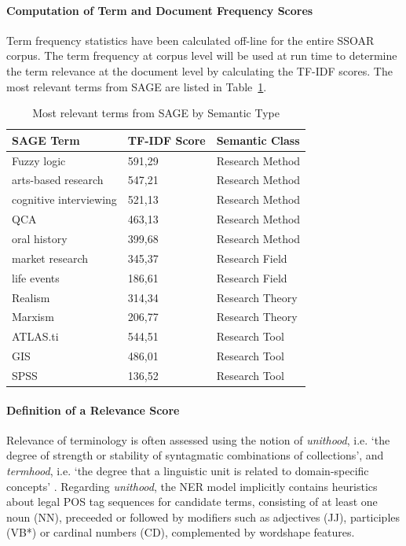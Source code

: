 \paragraph{Computation of Term and Document Frequency Scores}%
Term frequency statistics have been calculated off-line for the entire SSOAR corpus.
The term frequency at corpus level will be used at run time to determine the term relevance at the document level by calculating the TF-IDF scores. The most relevant terms from SAGE are listed in Table~\ref{tab:SAGET}.
\begin{table}
\center
\small
  \caption{Most relevant terms from SAGE by Semantic Type}
\begin{tabular}{lll}
  \label{tab:SAGET}
  \textbf{SAGE Term} & \textbf{TF-IDF Score}  & \textbf{Semantic Class}   \\ \hline  
Fuzzy logic	  &	591,29  &		Research Method  \\
arts-based research	 &	547,21  &		Research Method \\
cognitive interviewing  &		521,13  &		Research Method \\  
QCA	 &	463,13  &		Research Method   \\ 
oral history	 &	399,68  &		Research Method \\ \hline  
market research  &		345,37  &		Research Field \\
life events  &		186,61  &		Research Field \\ \hline 
Realism  &		314,34  &		Research Theory \\
Marxism  &		206,77  &		Research Theory \\ \hline  
ATLAS.ti  &		544,51  &		Research Tool\\
GIS	 &	486,01  &		Research Tool\\
SPSS	  &	136,52  &		Research Tool \\ \hline  
  
\end{tabular}
\end{table}


\paragraph{Definition of a Relevance Score}%
\label{para:relscore}
Relevance of terminology is often assessed using the notion of 
\textit{unithood}, i.e. `the degree of strength or stability of syntagmatic combinations of collections', and 
\textit{termhood}, i.e. `the degree that a linguistic unit is related to domain-specific concepts' \cite{kageura1996methods}.
Regarding \textit{unithood}, the NER model implicitly contains heuristics about legal POS tag sequences for candidate terms, 
consisting of at least one noun (NN), preceeded or followed by modifiers such as adjectives (JJ), participles (VB*) or cardinal numbers (CD), complemented by wordshape features.

